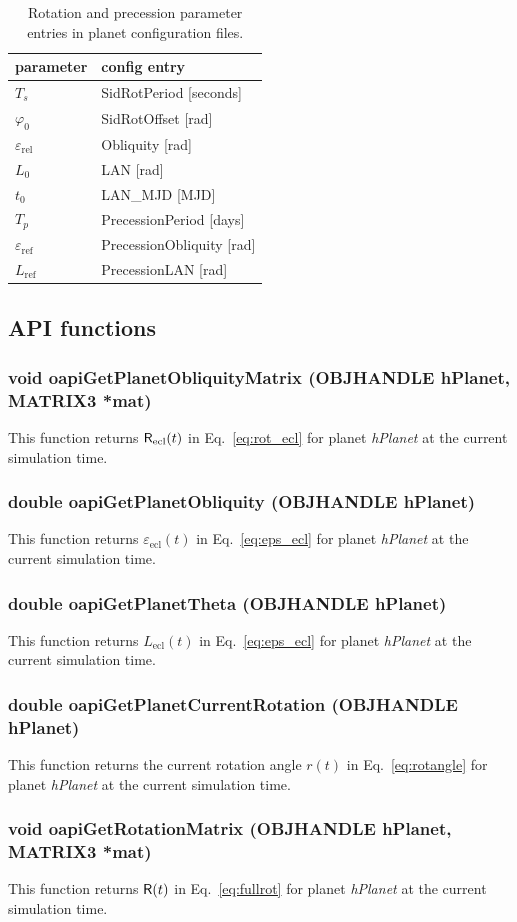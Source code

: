 \documentclass[a4paper]{article}
\newcommand{\mat}[1]{\ensuremath \mathsf{#1}}
\begin{document}
\begin{table}[hb]
\begin{tabular}{ll}
parameter & config entry \\ \hline
$T_s$ & SidRotPeriod [seconds] \\
$\varphi_0$ & SidRotOffset [rad] \\
$\varepsilon_\mathrm{rel}$ & Obliquity [rad] \\
$L_0$ & LAN [rad] \\
$t_0$ & LAN\_MJD [MJD] \\
$T_p$ & PrecessionPeriod [days] \\
$\varepsilon_\mathrm{ref}$ & PrecessionObliquity [rad] \\
$L_\mathrm{ref}$ & PrecessionLAN [rad]
\end{tabular}
\caption{Rotation and precession parameter entries in planet configuration files.}
\label{tab:param}
\end{table}

\subsection{API functions}
\subsubsection{void oapiGetPlanetObliquityMatrix (OBJHANDLE hPlanet, MATRIX3 *mat)}
This function returns $\mat{R}_\mathrm{ecl}(t)$ in Eq.~\ref{eq:rot_ecl} for planet \emph{hPlanet} at the current simulation time.

\subsubsection{double oapiGetPlanetObliquity (OBJHANDLE hPlanet)}
This function returns $\varepsilon_\mathrm{ecl}(t)$ in Eq.~\ref{eq:eps_ecl} for planet \emph{hPlanet} at the current simulation time.

\subsubsection{double oapiGetPlanetTheta (OBJHANDLE hPlanet)}
This function returns $L_\mathrm{ecl}(t)$ in Eq.~\ref{eq:eps_ecl} for planet \emph{hPlanet} at the current simulation time.

\subsubsection{double oapiGetPlanetCurrentRotation (OBJHANDLE hPlanet)}
This function returns the current rotation angle $r(t)$ in Eq.~\ref{eq:rotangle} for planet \emph{hPlanet} at the current simulation time.

\subsubsection{void oapiGetRotationMatrix (OBJHANDLE hPlanet, MATRIX3 *mat)}
This function returns $\mat{R}(t)$ in Eq.~\ref{eq:fullrot} for planet \emph{hPlanet} at the current simulation time.
\end{document}
